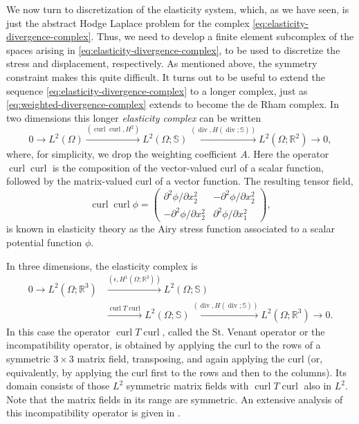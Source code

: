 {We now turn to discretization of the elasticity system, which, as we have seen, is just the abstract Hodge Laplace problem for the complex \eqref{eq:elasticity-divergence-complex}. Thus, we need to develop a finite element subcomplex of the spaces arising in \eqref{eq:elasticity-divergence-complex}, to be used to discretize the stress and displacement, respectively. As mentioned above, the symmetry constraint makes this quite difficult. It turns out to be useful to extend the sequence \eqref{eq:elasticity-divergence-complex} to a longer complex, just as \eqref{eq:weighted-divergence-complex} extends to become the de Rham complex. In two dimensions this longer \emph{elasticity complex} can be written}
\begin{equation}\label{eq:two-dimensional-elasticity-complex}
0\to L^2(\Omega)\xrightarrow{(\operatorname{curl}\operatorname{curl},H^2)}L^2(\Omega;\mathbb S)\xrightarrow{(\operatorname{div},H(\operatorname{div};\mathbb S))}L^2(\Omega;\mathbb R^2)\to0,
\end{equation}
{where, for simplicity, we drop the weighting coefficient $A$. Here the operator $\operatorname{curl}\operatorname{curl}$ is the composition of the vector-valued curl of a scalar function, followed by the matrix-valued curl of a vector function. The resulting tensor field,}
\[
\operatorname{curl}\operatorname{curl}\phi=
\begin{pmatrix}\partial^2\phi/\partial x_2^2&-\partial^2\phi/\partial x_2^2\\-\partial^2\phi/\partial x_2^2&\partial^2\phi/\partial x_1^2\end{pmatrix},
\]
{is known in elasticity theory as the Airy stress function associated to a scalar potential function $\phi$.}

{In three dimensions, the elasticity complex is}
\[
\begin{aligned}
0\to L^2(\Omega;\mathbb R^3)&\xrightarrow{(\epsilon,H^1(\Omega;\mathbb R^3))}L^2(\Omega;\mathbb S)\\
&\xrightarrow{\operatorname{curl}T\operatorname{curl}}L^2(\Omega;\mathbb S)\xrightarrow{(\operatorname{div},H(\operatorname{div};\mathbb S))}L^2(\Omega;\mathbb R^3)\to0.
\end{aligned}
\]
{In this case the operator $\operatorname{curl}T\operatorname{curl}$, called the St. Venant operator or the incompatibility operator, is obtained by applying the curl to the rows of a symmetric $3\times3$ matrix field, transposing, and again applying the curl (or, equivalently, by applying the curl first to the rows and then to the columns). Its domain consists of those $L^2$ symmetric matrix fields with $\operatorname{curl}T\operatorname{curl}$ also in $L^2$. Note that the matrix fields in its range are symmetric. An extensive analysis of this incompatibility operator is given in .}

